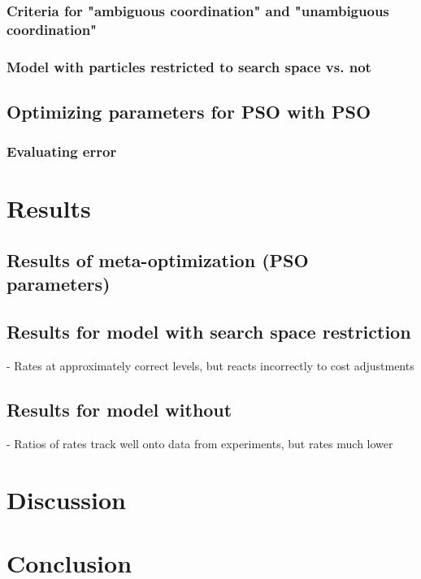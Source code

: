 \documentclass[12pt]{article}
\begin{document}
\subsubsection{Criteria for "ambiguous coordination" and "unambiguous coordination"}
\subsubsection{Model with particles restricted to search space vs. not}

\subsection{Optimizing parameters for PSO with PSO}
\subsubsection{Evaluating error}

\section{Results}
\subsection{Results of meta-optimization (PSO parameters)}
\subsection{Results for model with search space restriction}
- Rates at approximately correct levels, but reacts incorrectly to cost adjustments
\subsection{Results for model without}
- Ratios of rates track well onto data from experiments, but rates much lower


\section{Discussion}



\section{Conclusion}





\end{document}
